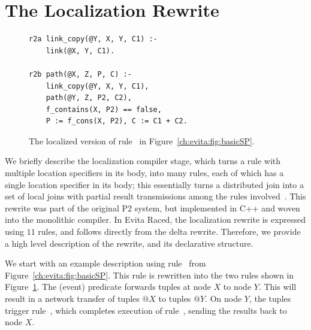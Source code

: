\section{The Localization Rewrite}
\label{ch:evita:sec:local}

\begin{figure}[!t]
\ssp
\centering
\begin{lstlisting}
r2a link_copy(@Y, X, Y, C1) :-
    link(@X, Y, C1).

r2b path(@X, Z, P, C) :-
    link_copy(@Y, X, Y, C1), 
    path(@Y, Z, P2, C2),
    f_contains(X, P2) == false,
    P := f_cons(X, P2), C := C1 + C2.
\end{lstlisting}
\caption{\label{ch:evita:fig:basicSPLocal}The localized version of rule~ in
Figure~\ref{ch:evita:fig:basicSP}.}
\end{figure}

We briefly describe the localization compiler stage, which turns a rule with
multiple location specifiers in its body, into many rules, each of which has a
single location specifier in its body; this essentially turns a distributed
join into a set of local joins with partial result transmissions among the
rules involved~\cite{loo-sigmod06}.  This rewrite was part of the original P2
system, but implemented in C++ and woven into the monolithic compiler.  In
Evita Raced, the localization rewrite is expressed using $11$ rules, and
follows directly from the delta rewrite. Therefore, we provide a high level
description of the rewrite, and its declarative structure.

We start with an example description using rule~ from
Figure~\ref{ch:evita:fig:basicSP}.  This rule is rewritten into the two rules
shown in Figure~\ref{ch:evita:fig:basicSPLocal}.  The  (event)
predicate forwards  tuples at node $X$ to node $Y$.  This will result
in a network transfer of  tuples $@X$ to  tuples $@Y$.
On node $Y$, the  tuples trigger rule~, which completes
execution of rule~, sending the  results back to node $X$.

